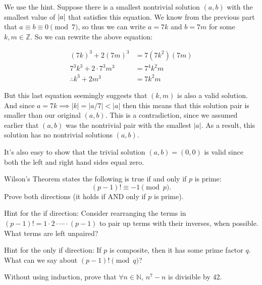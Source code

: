\documentclass[11pt]{article}
\begin{document}
\begin{Parts}

\begin{solution}
  We use the hint. Suppose there is a smallest nontrivial solution $(a, b)$ with the smallest value of $\left\lvert a \right\rvert$ that satisfies this equation. We know from the previous part that $a \equiv b \equiv 0 \pmod 7$, so thus we can write $a = 7k$ and $b = 7m$ for some $k, m \in \mathbb Z$. So we can rewrite the above equation: 

  \begin{align*}
    (7k)^3 + 2(7m)^3 &= 7(7k^2)(7m)\\
    7^3 k^3 + 2 \cdot 7^3m^3 &= 7^4k^2m\\
    \therefore k^3 + 2m^3 &= 7k^2m
  \end{align*}

  But this last equation seemingly suggests that $(k, m)$ is also a valid solution. And since $a = 7k \implies |k| = |a/7| < |a|$ then this means that this solution pair is smaller than our original $(a, b)$. This is a contradiction, since we assumed earlier that $(a, b)$ was the nontrivial pair with the smallest $|a|$. As a result, this solution has no nontrivial solutions $(a, b)$. 

  It's also easy to show that the trivial solution $(a, b) = (0, 0)$ is valid since both the left and right hand sides equal zero.
\end{solution}

\end{Parts}
\pagebreak 
{}

Wilson's Theorem states the following is true if and only if $p$ is prime:
    \[(p - 1)! \equiv -1 \pmod{p}.\]
Prove both directions (it holds if AND only if $p$ is prime).

Hint for the if direction: Consider rearranging the terms in $(p - 1)! = 1 \cdot 2 \cdot \cdots \cdot (p - 1)$ to pair up terms with their inverses, when possible. What terms are left unpaired?

Hint for the only if direction: If $p$ is composite, then it has some prime factor $q$.  What can we say about $(p-1)! \pmod{q}$?

\pagebreak
{}

Without using induction, prove that $\forall n \in \mathbb{N}$, $n^7-n$ is divisible by 42.
\end{document}
